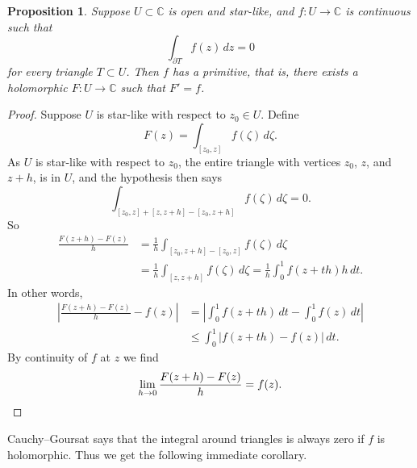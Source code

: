 \documentclass[12pt,openany]{book}
\newcommand{\abs}[1]{\left\lvert {#1} \right\rvert}
\newcommand{\C}{{\mathbb{C}}}
\theoremstyle{plain}
\newtheorem{prop}[thm]{Proposition}
\theoremstyle{remark}
\theoremstyle{definition}
\theoremstyle{exercise}
\theoremstyle{example}
\begin{document}
\begin{prop} \label{prop:primitiveinstarlike1}
Suppose $U \subset \C$ is open and star-like,
and $f \colon U \to \C$ is continuous such that
\begin{equation*}
\int_{\partial T} f(z) \, dz = 0
\end{equation*}
for every triangle $T \subset U$.
Then $f$ has a primitive, that is,
there exists a holomorphic $F \colon U \to \C$
such that $F' = f$.
\end{prop}

\begin{proof}
Suppose $U$ is star-like with respect to $z_0 \in U$.  Define
\begin{equation*}
F(z) = \int_{[z_0,z]} f(\zeta) \, d\zeta .
\end{equation*}
As $U$ is star-like with respect to $z_0$, 
the entire triangle with
vertices $z_0$, $z$, and $z+h$,
is in $U$, and the
hypothesis then says
\begin{equation*}
\int_{[z_0,z]+[z,z+h]-[z_0,z+h]} f(\zeta) \, d\zeta = 0 .
\end{equation*}
So
\begin{equation*}
\begin{split}
\frac{F(z+h)-F(z)}{h} &=
\frac{1}{h}
\int_{[z_0,z+h]-[z_0,z]} f(\zeta) \, d\zeta
\\
& =
\frac{1}{h}
\int_{[z,z+h]} f(\zeta) \, d\zeta
=
\frac{1}{h}
\int_0^1 f(z+th) h \, dt .
\end{split}
\end{equation*}
In other words,
\begin{equation*}
\begin{split}
\abs{
\frac{F(z+h)-F(z)}{h} 
-
f(z)
}
& =
\abs{
\int_0^1 f(z+th) \, dt
-
\int_0^1 f(z) \, dt
}
\\
& \leq
\int_0^1 \abs{f(z+th)-f(z)} \, dt .
\end{split}
\end{equation*}
By continuity of $f$ at $z$ we find
\begin{equation*}
\lim_{h \to 0}
\frac{F(z+h)-F(z)}{h} 
=
f(z) . \qedhere
\end{equation*}
\end{proof}

Cauchy--Goursat says that the integral around
triangles is always zero if $f$ is holomorphic.  Thus we get
the following immediate corollary.
\end{document}
